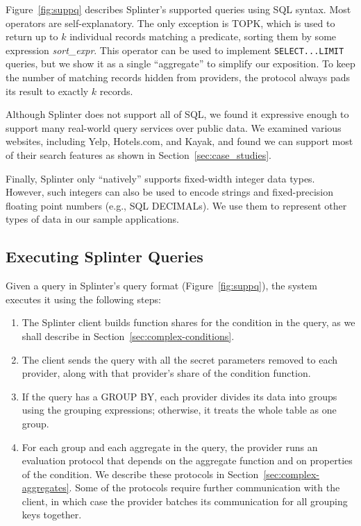Figure~\ref{fig:suppq} describes Splinter's supported queries using SQL syntax.
Most operators are self-explanatory.
The only exception is TOPK, which is used to return up to $k$ individual records
matching a predicate, sorting them by some expression \emph{sort\_expr}.
This operator can be used to implement \texttt{SELECT...LIMIT} queries, but
we show it as a single ``aggregate'' to simplify our exposition.
To keep the number of matching records hidden from providers, the
protocol always pads its result to exactly $k$ records.


Although Splinter does not support all of SQL, we found it expressive enough to
support many real-world query services over public data.
We examined various websites, including Yelp, Hotels.com, and Kayak, and found
we can support most of their search features as shown in Section~\ref{sec:case_studies}.

Finally, Splinter only ``natively'' supports fixed-width integer data
types. However, such integers can also be used to encode strings and
fixed-precision floating point numbers (e.g., SQL DECIMALs).
We use them to represent other types of data in our sample applications.

\subsection{Executing Splinter Queries}
\label{sec:complex}

Given a query in Splinter's query format (Figure~\ref{fig:suppq}), the system executes
it using the following steps:

\begin{enumerate}
	\item The Splinter client builds function shares for the condition in the query,
	as we shall describe in Section~\ref{sec:complex-conditions}.
	\item The client sends the query with all the secret parameters removed to
	each provider, along with that provider's share of the condition function.
	\item If the query has a GROUP BY, each provider divides its data into
	groups using the grouping expressions; otherwise, it treats the whole table
	as one group.
	\item \label{agg-step}
	For each group and each aggregate in the query, the provider runs an
	evaluation protocol that depends on the aggregate function and on
	properties of the condition. We describe these protocols in
	Section~\ref{sec:complex-aggregates}.
	Some of the protocols require
	further communication with the client, in which case the provider
	batches its communication for all grouping keys together.
\end{enumerate}

